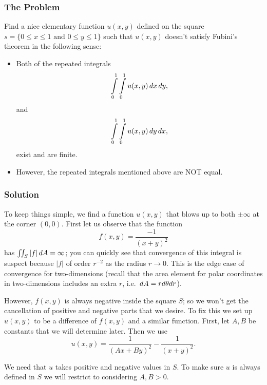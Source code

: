 \subsubsection*{The Problem}

Find a nice elementary function \(u(x, y)\) defined on the square \(s = \{0 \leq x \leq 1 \text{ and } 0 \leq y \leq 1\}\) such that \(u(x,y)\) doesn't satisfy Fubini's theorem in the following sense:
\begin{itemize}
\item Both of the repeated integrals
\begin{equation}
\int\limits_0^1 \int\limits_0^1 u(x,y) \, dx \, dy,
\end{equation}
and
\begin{equation}
\int\limits_0^1 \int\limits_0^1 u(x,y) \, dy \, dx,
\end{equation}
exist and are finite.
\item However, the repeated integrals mentioned above are NOT equal.
\end{itemize}

\subsubsection*{Solution}

To keep things simple, we find a function \(u(x,y)\) that blows up to both \(\pm \infty\) at the corner \((0,0)\). First let us observe that the function 
\begin{equation}
f(x,y) = \frac{-1}{(x+y)^2}
\end{equation}
has \(\iint_S |f| \, dA = \infty\); you can quickly see that convergence of this integral is suspect because \(|f|\) of order \(r^{-2}\) as the radius \(r \to 0\). This is the edge case of convergence
for two-dimensions (recall that the area element for polar coordinates in two-dimensions includes an extra \(r\), i.e. \(\, dA = r d\theta dr\)). 

However, \(f(x,y)\) is always negative inside the square \(S\); so we won't get the cancellation of positive and negative parts that we desire. To fix this we set up \(u(x,y)\) to be a difference
of \(f(x,y)\) and a similar function. First, let \(A, B\) be constants that we will determine later. Then we use
\begin{equation}
u(x,y) = \frac{1}{(Ax + By)^2} - \frac{1}{(x+y)^2} .
\end{equation}

We need that \(u\) takes positive and negative values in \(S\). To make sure \(u\) is always defined in \(S\) we will restrict to considering \(A, B > 0\).

